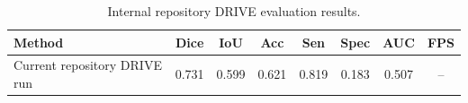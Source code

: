 \begin{table}[H]
\centering
\caption{Internal repository DRIVE evaluation results.}
\label{tab:drive_internal_results}
\begin{tabular}{lccccccc}
\toprule
Method & Dice & IoU & Acc & Sen & Spec & AUC & FPS \\
\midrule
Current repository DRIVE run & 0.731 & 0.599 & 0.621 & 0.819 & 0.183 & 0.507 & -- \\
\bottomrule
\end{tabular}
\end{table}
